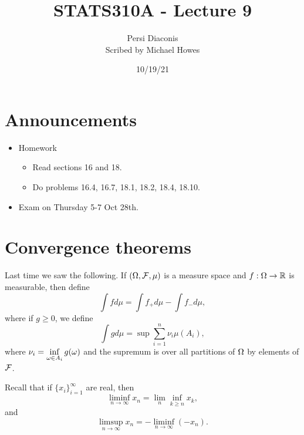 




\title{STATS310A - Lecture 9}
\author{Persi Diaconis\\ Scribed by Michael Howes}
\date{10/19/21}

\pagestyle{fancy}
\fancyhf{}


\maketitle
\tableofcontents
\section{Announcements}
\begin{itemize}
    \item Homework
    \begin{itemize}
        \item Read sections 16 and 18.
        \item Do problems 16.4, 16.7, 18.1, 18.2, 18.4, 18.10.
    \end{itemize}
    \item Exam on Thursday 5-7 Oct 28th.
\end{itemize}
\section{Convergence theorems}
Last time we saw the following. If $({{\Omega}},{\mathcal{F}},\mu)$ is a measure space and $f: {{\Omega}} \to {\mathbb R}$ is measurable, then define 
\[\int fd\mu = \int f_+ d\mu - \int f_-d\mu, \]
where if $g \ge 0$, we define
\[\int g d\mu = \sup \sum_{i=1}^n \nu_i \mu(A_i), \]
where $\nu_i = \inf\limits_{{\omega} \in A_i} g({\omega})$ and the supremum is over all partitions of ${{\Omega}}$ by elements of ${\mathcal{F}}$.


Recall that if $\{x_i\}_{i=1}^\infty$ are real, then 
\[\liminf_{n \to \infty} x_n = \lim_n \inf_{k \ge n}x_k, \]
and 
\[\limsup_{n \to \infty} x_n = -\liminf_{n \to \infty} (-x_n). \]

